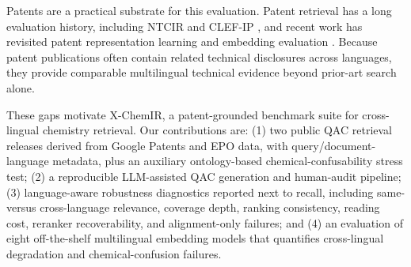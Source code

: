 Patents are a practical substrate for this evaluation. Patent retrieval has a
long evaluation history, including NTCIR and CLEF-IP
\citep{prime2002,clefip2013}, and recent work has revisited patent
representation learning and embedding evaluation
\citep{paecter2024,patentembeddings2026}. Because patent publications often
contain related technical disclosures across languages, they provide comparable
multilingual technical evidence beyond prior-art search alone.

These gaps motivate X-ChemIR, a patent-grounded benchmark suite for
cross-lingual chemistry retrieval. Our contributions are: (1) two public QAC
retrieval releases derived from Google Patents and EPO data, with
query/document-language metadata, plus an auxiliary ontology-based
chemical-confusability stress test; (2) a reproducible LLM-assisted QAC
generation and human-audit pipeline; (3) language-aware robustness diagnostics
reported next to recall, including same- versus cross-language relevance,
coverage depth, ranking consistency, reading cost, reranker recoverability, and
alignment-only failures; and (4) an evaluation of eight off-the-shelf
multilingual embedding models that quantifies cross-lingual degradation and
chemical-confusion failures.
